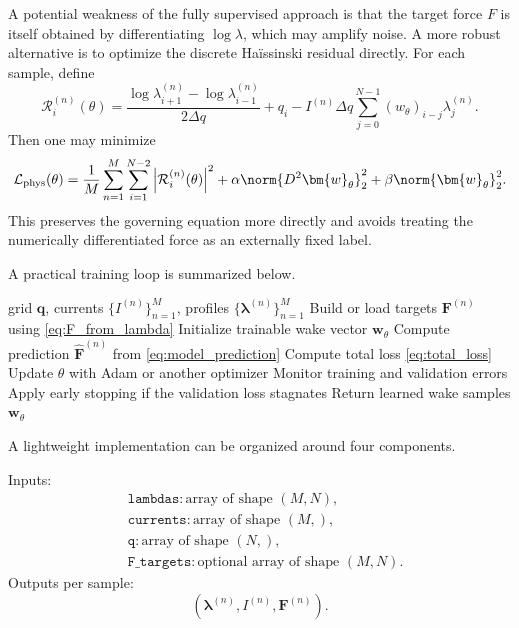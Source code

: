 \documentclass[11pt,a4paper]{article}
\begin{document}
\begin{sloppypar}
A potential weakness of the fully supervised approach is that the target force $F$ is itself obtained by differentiating $\log\lambda$, which may amplify noise. A more robust alternative is to optimize the discrete Ha\"issinski residual directly. For each sample, define
\begin{equation}
\mathcal{R}^{(n)}_i(\theta)=
\frac{\log\lambda^{(n)}_{i+1}-\log\lambda^{(n)}_{i-1}}{2\Delta q}
+q_i
-I^{(n)}\Delta q\sum_{j=0}^{N-1}(w_{\theta})_{i-j}\lambda^{(n)}_j.
\end{equation}
Then one may minimize
\begin{equation}
\mathcal{L}_{\mathrm{phys}}(\theta)=\frac{1}{M}\sum_{n=1}^{M}\sum_{i=1}^{N-2}
\left|\mathcal{R}^{(n)}_i(\theta)\right|^2
+\alpha\norm{D^2\bm{w}_{\theta}}_2^2
+\beta\norm{\bm{w}_{\theta}}_2^2.
\end{equation}
This preserves the governing equation more directly and avoids treating the numerically differentiated force as an externally fixed label.


A practical training loop is summarized below.

\begin{algorithm}[h]
\caption{Training a Toeplitz wake model from Ha\"issinski profiles}
\begin{algorithmic}[1]
\Require grid $\bm{q}$, currents $\{I^{(n)}\}_{n=1}^{M}$, profiles $\{\bm{\lambda}^{(n)}\}_{n=1}^{M}$
\State Build or load targets $\bm{F}^{(n)}$ using \eqref{eq:F_from_lambda}
\State Initialize trainable wake vector $\bm{w}_{\theta}$
            \State Compute prediction $\widehat{\bm{F}}^{(n)}$ from \eqref{eq:model_prediction}
        \EndFor
        \State Compute total loss \eqref{eq:total_loss}
        \State Update $\theta$ with Adam or another optimizer
    \EndFor
    \State Monitor training and validation errors
    \State Apply early stopping if the validation loss stagnates
\EndFor
\State Return learned wake samples $\bm{w}_{\theta}$
\end{algorithmic}
\end{algorithm}


A lightweight implementation can be organized around four components.

Inputs:
\begin{align}
&\texttt{lambdas}: \text{array of shape } (M,N),\\
&\texttt{currents}: \text{array of shape } (M,),\\
&\texttt{q}: \text{array of shape } (N,),\\
&\texttt{F\_targets}: \text{optional array of shape } (M,N).
\end{align}
Outputs per sample:
\begin{equation}
(\bm{\lambda}^{(n)}, I^{(n)}, \bm{F}^{(n)}).
\end{equation}


\end{sloppypar}
\end{document}
